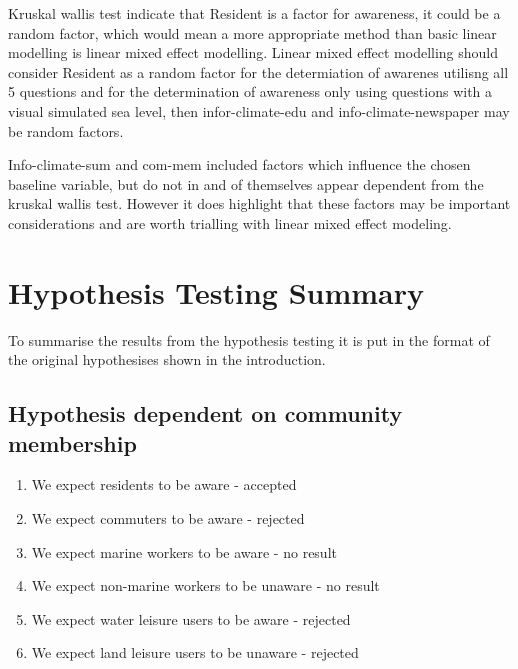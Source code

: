 Kruskal wallis test indicate that Resident is a factor for awareness, it could be a random factor, which would mean a more appropriate method than basic linear modelling is linear mixed effect modelling. Linear mixed effect modelling should consider Resident as a random factor for the determiation of awarenes utilisng all 5 questions and for the determination of awareness only using questions with a visual simulated sea level, then infor-climate-edu and info-climate-newspaper may be random factors.

Info-climate-sum and com-mem included factors which influence the chosen baseline variable, but do not in and of themselves appear dependent from the kruskal wallis test. However it does highlight that these factors may be important considerations and are worth trialling with linear mixed effect modeling.



\section{Hypothesis Testing Summary}
To summarise the results from the hypothesis testing it is put in the format of the original hypothesises shown in the introduction. 

\subsection{Hypothesis dependent on community membership}
\begin{enumerate}
    \item We expect residents to be aware - accepted
    \item We expect commuters to be aware - rejected
    \item We expect marine workers to be aware - no result
    \item We expect non-marine workers to be unaware - no result
    \item We expect water leisure users to be aware - rejected
    \item We expect land leisure users to be unaware - rejected
    \end{enumerate}
